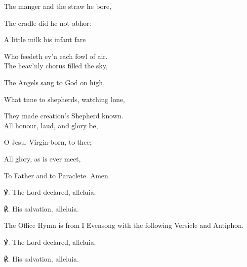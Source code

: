 \begin{paracol}{2}[]
\begin{hangparas}{1.25em}{1}
The manger and the straw he bore,

The cradle did he not abhor:

A little milk his infant fare

Who feedeth ev'n each fowl of air.\\

The heav'nly chorus filled the sky,

The Angels sang to God on high,

What time to shepherds, watching lone,

They made creation's Shepherd known.\\

All honour, laud, and glory be,

O Jesu, Virgin-born, to thee;

All glory, as is ever meet,

To Father and to Paraclete. Amen.\\
\end{hangparas}

℣. The Lord declared, alleluia.

℟. His salvation, alleluia.


\fussy
\end{paracol}

\begin{rubric}
	The Office Hymn is from I Evensong with the following Versicle and Antiphon.
\end{rubric}

℣. The Lord declared, alleluia.

℟. His salvation, alleluia.



